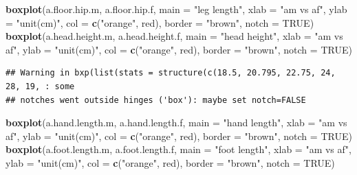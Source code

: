 \documentclass[]{article}
\newenvironment{Shaded}{\begin{snugshade}}{\end{snugshade}}
\newcommand{\DataTypeTok}[1]{\textcolor[rgb]{0.13,0.29,0.53}{#1}}
\newcommand{\KeywordTok}[1]{\textcolor[rgb]{0.13,0.29,0.53}{\textbf{#1}}}
\newcommand{\NormalTok}[1]{#1}
\newcommand{\OtherTok}[1]{\textcolor[rgb]{0.56,0.35,0.01}{#1}}
\newcommand{\StringTok}[1]{\textcolor[rgb]{0.31,0.60,0.02}{#1}}
\begin{document}
\begin{Shaded}
\begin{Highlighting}[]
\KeywordTok{boxplot}\NormalTok{(a.floor.hip.m, a.floor.hip.f, }
        \DataTypeTok{main =} \StringTok{"leg length"}\NormalTok{,}
        \DataTypeTok{xlab =} \StringTok{"am vs af"}\NormalTok{,}
        \DataTypeTok{ylab =} \StringTok{"unit(cm)"}\NormalTok{,}
        \DataTypeTok{col =} \KeywordTok{c}\NormalTok{(}\StringTok{"orange"}\NormalTok{, }\StringTok{\textquotesingle{}red\textquotesingle{}}\NormalTok{),}
        \DataTypeTok{border =} \StringTok{"brown"}\NormalTok{,}
        \DataTypeTok{notch =} \OtherTok{TRUE}\NormalTok{)}
\KeywordTok{boxplot}\NormalTok{(a.head.height.m, a.head.height.f,}
        \DataTypeTok{main =} \StringTok{"head height"}\NormalTok{,}
        \DataTypeTok{xlab =} \StringTok{"am vs af"}\NormalTok{,}
        \DataTypeTok{ylab =} \StringTok{"unit(cm)"}\NormalTok{,}
        \DataTypeTok{col =} \KeywordTok{c}\NormalTok{(}\StringTok{"orange"}\NormalTok{, }\StringTok{\textquotesingle{}red\textquotesingle{}}\NormalTok{),}
        \DataTypeTok{border =} \StringTok{"brown"}\NormalTok{,}
        \DataTypeTok{notch =} \OtherTok{TRUE}\NormalTok{)}
\end{Highlighting}
\end{Shaded}

\begin{verbatim}
## Warning in bxp(list(stats = structure(c(18.5, 20.795, 22.75, 24, 28, 19, : some
## notches went outside hinges ('box'): maybe set notch=FALSE
\end{verbatim}

\begin{Shaded}
\begin{Highlighting}[]
\KeywordTok{boxplot}\NormalTok{(a.hand.length.m, a.hand.length.f,}
        \DataTypeTok{main =} \StringTok{"hand length"}\NormalTok{,}
        \DataTypeTok{xlab =} \StringTok{"am vs af"}\NormalTok{,}
        \DataTypeTok{ylab =} \StringTok{"unit(cm)"}\NormalTok{,}
        \DataTypeTok{col =} \KeywordTok{c}\NormalTok{(}\StringTok{"orange"}\NormalTok{, }\StringTok{\textquotesingle{}red\textquotesingle{}}\NormalTok{),}
        \DataTypeTok{border =} \StringTok{"brown"}\NormalTok{,}
        \DataTypeTok{notch =} \OtherTok{TRUE}\NormalTok{)}
\KeywordTok{boxplot}\NormalTok{(a.foot.length.m, a.foot.length.f,}
        \DataTypeTok{main =} \StringTok{"foot length"}\NormalTok{,}
        \DataTypeTok{xlab =} \StringTok{"am vs af"}\NormalTok{,}
        \DataTypeTok{ylab =} \StringTok{"unit(cm)"}\NormalTok{,}
        \DataTypeTok{col =} \KeywordTok{c}\NormalTok{(}\StringTok{"orange"}\NormalTok{, }\StringTok{\textquotesingle{}red\textquotesingle{}}\NormalTok{),}
        \DataTypeTok{border =} \StringTok{"brown"}\NormalTok{,}
        \DataTypeTok{notch =} \OtherTok{TRUE}\NormalTok{)}
\end{Highlighting}
\end{Shaded}
\end{document}
